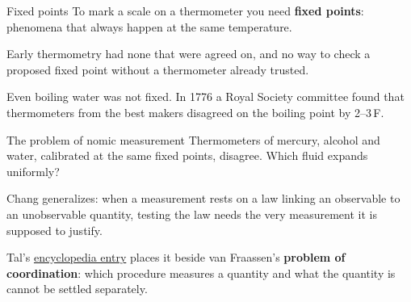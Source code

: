 \documentclass[aspectratio=169,11pt]{beamer}
\begin{document}
\begin{frame}[label=fixed]{Fixed points}
To mark a scale on a thermometer you need \textbf{fixed points}: phenomena that always happen at the same temperature.

\vspace{0.5em}
{\small Early thermometry had none that were agreed on, and no way to check a proposed fixed point without a thermometer already trusted.}

\vspace{0.4em}
\begin{center}
\end{center}

\vspace{0.6em}
Even boiling water was not fixed. In 1776 a Royal Society committee found that thermometers from the best makers disagreed on the boiling point by 2--3\,\textdegree F.
\end{frame}

\begin{frame}[label=nomic]{The problem of nomic measurement}
Thermometers of mercury, alcohol and water, calibrated at the same fixed points, disagree. Which fluid expands uniformly?

\begin{center}
\end{center}
\vspace{-0.4em}

{\small Chang generalizes: when a measurement rests on a law linking an observable to an unobservable quantity, testing the law needs the very measurement it is supposed to justify.}

{\small Tal's \href{https://plato.stanford.edu/entries/measurement-science/}{encyclopedia entry} places it beside van Fraassen's \textbf{problem of coordination}: which procedure measures a quantity and what the quantity is cannot be settled separately.}
\end{frame}
\end{document}
